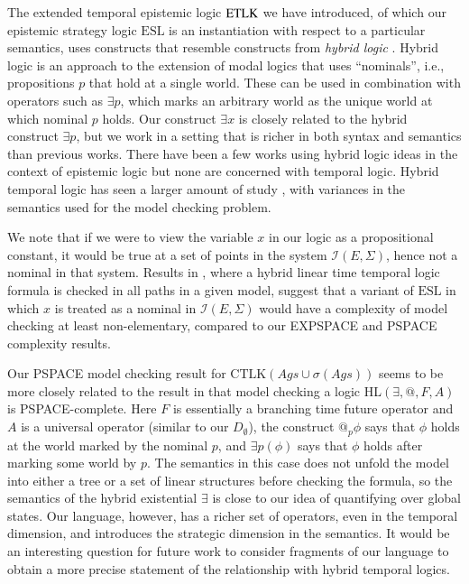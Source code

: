 \documentclass[a4wide]{article}
\newcommand{\CTLK}{\mbox{CTLK}}
\newcommand{\ESL}{\mbox{ESL}}
\theoremstyle{examplesty}
\newcommand{\strat}{\sigma}
\newcommand{\Ags}{\mathit{Ags}}
\newcommand{\I}{\mathcal{I}}
\newcommand{\Env}{E}
\newcommand{\Strats}{\Sigma}
\newcommand{\ETL}{{\rm ETLK}}
\begin{document}
The extended temporal epistemic logic $\ETL$ we have introduced, of which our epistemic 
strategy logic $\ESL$ is an instantiation with respect to a particular semantics, uses constructs that 
resemble constructs  from {\em hybrid logic} \cite{BS98}.
Hybrid logic is an approach to the extension of modal logics that 
uses ``nominals'', i.e., propositions $p$ that hold at a 
single world. These can be  used in combination with operators
such as  $\exists p$, which marks an arbitrary world
as the unique world at which nominal $p$ holds. Our construct $\exists x$ is 
closely related to the hybrid construct  $\exists p$, but we work in a setting
that is richer in both syntax and semantics than previous works. 
There have been a few works using hybrid logic ideas in the context of epistemic logic \cite{Hansen11,Roy09a} 
but none are  concerned with temporal logic. Hybrid temporal logic has seen a larger
amount of study \cite{BozzelliL10,FranceschetRS03,FranceschetR06,SchwentickW07}, 
with variances in the semantics used for the model checking problem. 

We note that if we were to view the variable $x$ in our logic as a propositional constant, 
it would be true at a set of points in the system $\I(\Env, \Strats)$, hence not a nominal in that system.
Results in \cite{BozzelliL10}, where a hybrid linear time temporal logic
formula is checked in all paths in a given model, suggest that 
a variant of $\ESL$ in which $x$ is treated  as a nominal in $\I(\Env, \Strats)$
would have a complexity of model checking at least non-elementary, compared to 
our EXPSPACE and PSPACE complexity results. 

Our PSPACE model checking result for $\CTLK(
\Ags
\cup \strat(\Ags))$ seems to be more closely related to the 
result in \cite{FranceschetR06} that 
model checking a logic HL$(\exists, @, F,A)$ is PSPACE-complete. 
Here $F$ is essentially a branching  time future operator and $A$ is a universal operator (similar to 
our $D_{\emptyset}$), the construct $@_p\phi$ says that $\phi$ holds at the world marked by the 
nominal $p$, and $\exists p(\phi)$ says that $\phi$ holds after marking some world by $p$. 
The semantics in this case does not unfold the model 
into either a tree or a set of linear structures before checking the formula, 
so the semantics of the hybrid existential $\exists$ is close to our idea
of quantifying over global states. Our language, however, has a richer set of 
operators, even in the temporal dimension, and introduces the strategic dimension in the 
semantics. It would be an interesting question for future work to 
consider fragments of our language to obtain 
a more precise statement of the
relationship with hybrid temporal logics. 
\end{document}
